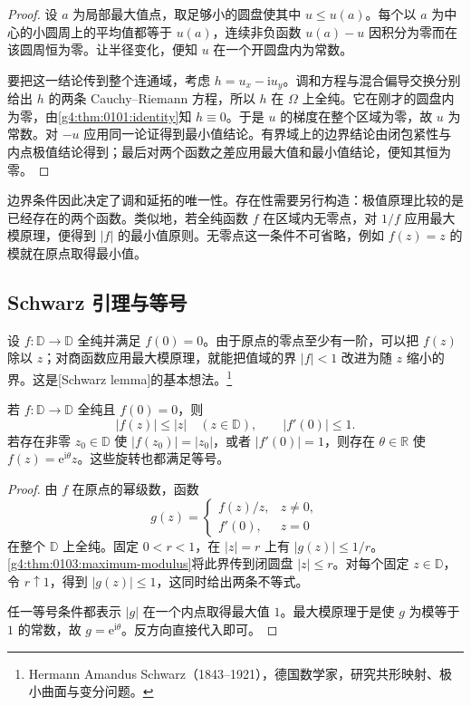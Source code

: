 \begin{proof}
	设 \(a\) 为局部最大值点，取足够小的圆盘使其中 \(u\leq u(a)\)。每个以 \(a\) 为中心的小圆周上的平均值都等于 \(u(a)\)，连续非负函数 \(u(a)-u\) 因积分为零而在该圆周恒为零。让半径变化，便知 \(u\) 在一个开圆盘内为常数。

	要把这一结论传到整个连通域，考虑 \(h=u_x-\mathrm{i}u_y\)。调和方程与混合偏导交换分别给出 \(h\) 的两条 Cauchy–Riemann 方程，所以 \(h\) 在 \(\Omega\) 上全纯。它在刚才的圆盘内为零，由\cref{g4:thm:0101:identity}知 \(h\equiv0\)。于是 \(u\) 的梯度在整个区域为零，故 \(u\) 为常数。对 \(-u\) 应用同一论证得到最小值结论。有界域上的边界结论由闭包紧性与内点极值结论得到；最后对两个函数之差应用最大值和最小值结论，便知其恒为零。
\end{proof}

边界条件因此决定了调和延拓的唯一性。存在性需要另行构造：极值原理比较的是已经存在的两个函数。类似地，若全纯函数 \(f\) 在区域内无零点，对 \(1/f\) 应用最大模原理，便得到 \(\lvert f\rvert\) 的最小值原则。无零点这一条件不可省略，例如 \(f(z)=z\) 的模就在原点取得最小值。

\subsection{Schwarz 引理与等号}
\label{g4:subsec:0103:02}
设 \(f\colon\mathbb D\rightarrow\mathbb D\) 全纯并满足 \(f(0)=0\)。由于原点的零点至少有一阶，可以把 \(f(z)\) 除以 \(z\)；对商函数应用最大模原理，就能把值域的界 \(\lvert f\rvert<1\) 改进为随 \(z\) 缩小的界。这是[Schwarz lemma]的基本想法。\footnote{Hermann Amandus Schwarz（1843--1921），德国数学家，研究共形映射、极小曲面与变分问题。}

\begin{theorem}[Schwarz 引理]
	\label{g4:thm:0103:schwarz}
	若 \(f\colon\mathbb D\rightarrow\mathbb D\) 全纯且 \(f(0)=0\)，则
	\[
		\lvert f(z)\rvert\leq\lvert z\rvert\quad(z\in\mathbb D),
		\qquad \lvert f'(0)\rvert\leq1.
	\]
	若存在非零 \(z_0\in\mathbb D\) 使 \(\lvert f(z_0)\rvert=\lvert z_0\rvert\)，或者 \(\lvert f'(0)\rvert=1\)，则存在 \(\theta\in\mathbb R\) 使 \(f(z)=\mathrm{e}^{\mathrm{i}\theta}z\)。这些旋转也都满足等号。
\end{theorem}

\begin{proof}
	由 \(f\) 在原点的幂级数，函数
	\[
		g(z)=
		\begin{cases}
			f(z)/z,&z\ne0,\\
			f'(0),&z=0
		\end{cases}
	\]
	在整个 \(\mathbb D\) 上全纯。固定 \(0<r<1\)，在 \(\lvert z\rvert=r\) 上有 \(\lvert g(z)\rvert\leq1/r\)。\cref{g4:thm:0103:maximum-modulus}将此界传到闭圆盘 \(\lvert z\rvert\leq r\)。对每个固定 \(z\in\mathbb D\)，令 \(r\uparrow1\)，得到 \(\lvert g(z)\rvert\leq1\)，这同时给出两条不等式。

	任一等号条件都表示 \(\lvert g\rvert\) 在一个内点取得最大值 \(1\)。最大模原理于是使 \(g\) 为模等于 \(1\) 的常数，故 \(g=\mathrm{e}^{\mathrm{i}\theta}\)。反方向直接代入即可。
\end{proof}

